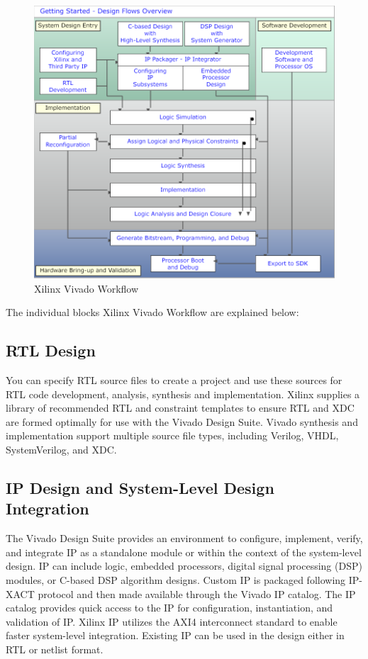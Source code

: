 \begin{figure}[H]
\begin{center}
\includegraphics[width=\textwidth]{images/FPGADesignFlow.png}
\caption{Xilinx Vivado Workflow}
\label{VivadoOverview}
\end{center}
\end{figure}

The individual blocks Xilinx Vivado Workflow are explained below:

\subsection{RTL Design}
You can specify RTL source files to create a project and use these sources for RTL code development, analysis, synthesis and implementation. Xilinx supplies a library of recommended RTL and constraint templates to ensure RTL and XDC are formed optimally for use with the Vivado Design Suite. Vivado synthesis and implementation support multiple source file types, including Verilog, VHDL, SystemVerilog, and XDC.

\subsection{IP Design and System-Level Design Integration}
The Vivado Design Suite provides an environment to configure, implement, verify, and integrate IP as a standalone module or within the context of the system-level design. IP can include logic, embedded processors, digital signal processing (DSP) modules, or C-based DSP algorithm designs. Custom IP is packaged following IP-XACT protocol and then made available through the Vivado IP catalog. The IP catalog provides quick access to the IP for configuration, instantiation, and validation of IP. Xilinx IP utilizes the AXI4 interconnect standard to enable faster system-level integration. Existing IP can be used in the design either in RTL or netlist format.

